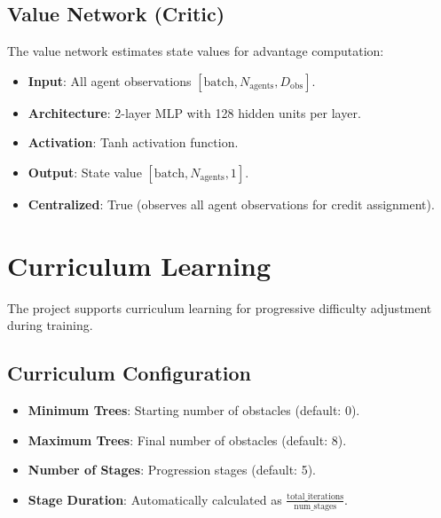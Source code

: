 \documentclass[11pt,a4paper]{article}
\begin{document}
\subsection{Value Network (Critic)}
\label{subsec:value_network}

The value network estimates state values for advantage computation:

\begin{itemize}
    \item \textbf{Input}: All agent observations $[\text{batch}, N_{\text{agents}}, D_{\text{obs}}]$.
    \item \textbf{Architecture}: 2-layer MLP with 128 hidden units per layer.
    \item \textbf{Activation}: Tanh activation function.
    \item \textbf{Output}: State value $[\text{batch}, N_{\text{agents}}, 1]$.
    \item \textbf{Centralized}: True (observes all agent observations for credit assignment).
\end{itemize}

\section{Curriculum Learning}
\label{sec:curriculum}

The project supports curriculum learning for progressive difficulty adjustment during training.

\subsection{Curriculum Configuration}
\label{subsec:curriculum_config}

\begin{itemize}
    \item \textbf{Minimum Trees}: Starting number of obstacles (default: 0).
    \item \textbf{Maximum Trees}: Final number of obstacles (default: 8).
    \item \textbf{Number of Stages}: Progression stages (default: 5).
    \item \textbf{Stage Duration}: Automatically calculated as $\frac{\text{total\_iterations}}{\text{num\_stages}}$.
\end{itemize}
\end{document}
